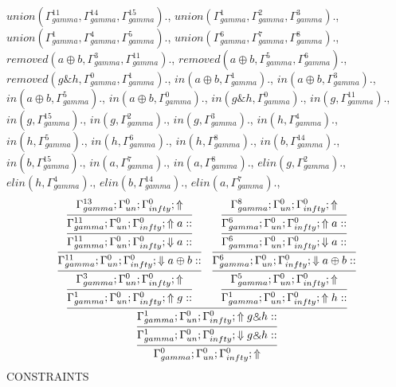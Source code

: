 \documentclass[a4paper, 11pt]{article}
\begin{document}
$union(\Gamma_{gamma}^{11}, \Gamma_{gamma}^{14}, \Gamma_{gamma}^{15}).$, $union(\Gamma_{gamma}^{1}, \Gamma_{gamma}^{2}, \Gamma_{gamma}^{3}).$, $union(\Gamma_{gamma}^{1}, \Gamma_{gamma}^{4}, \Gamma_{gamma}^{5}).$, $union(\Gamma_{gamma}^{6}, \Gamma_{gamma}^{7}, \Gamma_{gamma}^{8}).$, $removed(a \oplus b, \Gamma_{gamma}^{3}, \Gamma_{gamma}^{11}).$, $removed(a \oplus b, \Gamma_{gamma}^{5}, \Gamma_{gamma}^{6}).$, $removed(g \binampersand h, \Gamma_{gamma}^{0}, \Gamma_{gamma}^{1}).$, $in(a \oplus b, \Gamma_{gamma}^{1}).$, $in(a \oplus b, \Gamma_{gamma}^{3}).$, $in(a \oplus b, \Gamma_{gamma}^{5}).$, $in(a \oplus b, \Gamma_{gamma}^{0}).$, $in(g \binampersand h, \Gamma_{gamma}^{0}).$, $in(g, \Gamma_{gamma}^{11}).$, $in(g, \Gamma_{gamma}^{15}).$, $in(g, \Gamma_{gamma}^{2}).$, $in(g, \Gamma_{gamma}^{3}).$, $in(h, \Gamma_{gamma}^{4}).$, $in(h, \Gamma_{gamma}^{5}).$, $in(h, \Gamma_{gamma}^{6}).$, $in(h, \Gamma_{gamma}^{8}).$, $in(b, \Gamma_{gamma}^{14}).$, $in(b, \Gamma_{gamma}^{15}).$, $in(a, \Gamma_{gamma}^{7}).$, $in(a, \Gamma_{gamma}^{8}).$, $elin(g, \Gamma_{gamma}^{2}).$, $elin(h, \Gamma_{gamma}^{4}).$, $elin(b, \Gamma_{gamma}^{14}).$, $elin(a, \Gamma_{gamma}^{7}).$, 
\[
\infer{\Gamma_{ gamma}^{0} ; \Gamma_{un}^{0} ; \Gamma_{ infty}^{0} ;  \Uparrow }
{\infer{\Gamma_{ gamma}^{1} ; \Gamma_{un}^{0} ; \Gamma_{ infty}^{0} ;  \Downarrow g \binampersand h :: }
{\infer{\Gamma_{ gamma}^{1} ; \Gamma_{un}^{0} ; \Gamma_{ infty}^{0} ;  \Uparrow g \binampersand h :: }
{\infer{\Gamma_{ gamma}^{1} ; \Gamma_{un}^{0} ; \Gamma_{ infty}^{0} ;  \Uparrow g :: }
{\infer{\Gamma_{ gamma}^{3} ; \Gamma_{un}^{0} ; \Gamma_{ infty}^{0} ;  \Uparrow }
{\infer{\Gamma_{ gamma}^{11} ; \Gamma_{un}^{0} ; \Gamma_{ infty}^{0} ;  \Downarrow a \oplus b :: }
{\infer{\Gamma_{ gamma}^{11} ; \Gamma_{un}^{0} ; \Gamma_{ infty}^{0} ;  \Downarrow a :: }
{\infer{\Gamma_{ gamma}^{11} ; \Gamma_{un}^{0} ; \Gamma_{ infty}^{0} ;  \Uparrow a :: }
{\Gamma_{ gamma}^{13} ; \Gamma_{un}^{0} ; \Gamma_{ infty}^{0} ;  \Uparrow }}}}}
&
\infer{\Gamma_{ gamma}^{1} ; \Gamma_{un}^{0} ; \Gamma_{ infty}^{0} ;  \Uparrow h :: }
{\infer{\Gamma_{ gamma}^{5} ; \Gamma_{un}^{0} ; \Gamma_{ infty}^{0} ;  \Uparrow }
{\infer{\Gamma_{ gamma}^{6} ; \Gamma_{un}^{0} ; \Gamma_{ infty}^{0} ;  \Downarrow a \oplus b :: }
{\infer{\Gamma_{ gamma}^{6} ; \Gamma_{un}^{0} ; \Gamma_{ infty}^{0} ;  \Downarrow a :: }
{\infer{\Gamma_{ gamma}^{6} ; \Gamma_{un}^{0} ; \Gamma_{ infty}^{0} ;  \Uparrow a :: }
{\Gamma_{ gamma}^{8} ; \Gamma_{un}^{0} ; \Gamma_{ infty}^{0} ;  \Uparrow }}}}}}}}
\]
CONSTRAINTS
\end{document}
